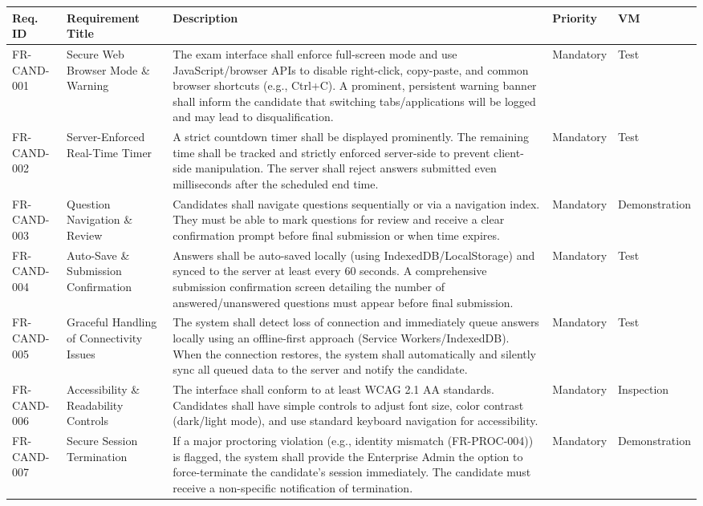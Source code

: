 \vspace{3em}

\captionsetup{hypcap=false}
\label{tab:candidate-exam-ui}
\begin{tabularx}{\linewidth}{|l|>{\raggedright\arraybackslash}p{4.5cm}|>{\raggedright\arraybackslash}X|l|l|}
\hline
\textbf{Req. ID} & \textbf{Requirement Title} & \textbf{Description} & \textbf{Priority} & \textbf{VM} \\ \hline
FR-CAND-001 & Secure Web Browser Mode \& Warning & The exam interface shall enforce full-screen mode and use JavaScript/browser APIs to disable right-click, copy-paste, and common browser shortcuts (e.g., Ctrl+C). A prominent, persistent warning banner shall inform the candidate that switching tabs/applications will be logged and may lead to disqualification. & Mandatory & Test \\ \hline
FR-CAND-002 & Server-Enforced Real-Time Timer & A strict countdown timer shall be displayed prominently. The remaining time shall be tracked and strictly enforced server-side to prevent client-side manipulation. The server shall reject answers submitted even milliseconds after the scheduled end time. & Mandatory & Test \\ \hline
FR-CAND-003 & Question Navigation \& Review & Candidates shall navigate questions sequentially or via a navigation index. They must be able to mark questions for review and receive a clear confirmation prompt before final submission or when time expires. & Mandatory & Demonstration \\ \hline
FR-CAND-004 & Auto-Save \& Submission Confirmation & Answers shall be auto-saved locally (using IndexedDB/LocalStorage) and synced to the server at least every 60 seconds. A comprehensive submission confirmation screen detailing the number of answered/unanswered questions must appear before final submission. & Mandatory & Test \\ \hline
FR-CAND-005 & Graceful Handling of Connectivity Issues & The system shall detect loss of connection and immediately queue answers locally using an offline-first approach (Service Workers/IndexedDB). When the connection restores, the system shall automatically and silently sync all queued data to the server and notify the candidate. & Mandatory & Test \\ \hline
FR-CAND-006 & Accessibility \& Readability Controls & The interface shall conform to at least WCAG 2.1 AA standards. Candidates shall have simple controls to adjust font size, color contrast (dark/light mode), and use standard keyboard navigation for accessibility. & Mandatory & Inspection \\ \hline
FR-CAND-007 & Secure Session Termination & If a major proctoring violation (e.g., identity mismatch (FR-PROC-004)) is flagged, the system shall provide the Enterprise Admin the option to force-terminate the candidate's session immediately. The candidate must receive a non-specific notification of termination. & Mandatory & Demonstration \\ \hline

\end{tabularx}